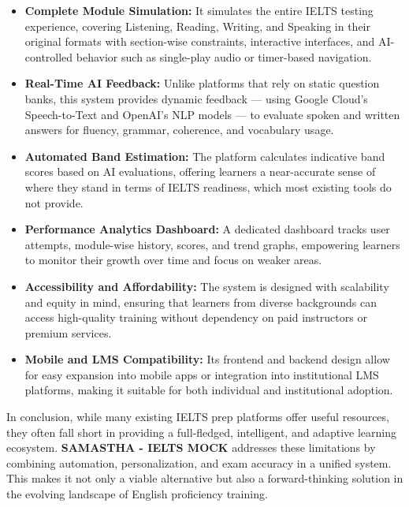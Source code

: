 \documentclass[a4paper,12pt]{article}
\begin{document}
\vspace{0.3cm}
\begin{itemize}
    \item \textbf{Complete Module Simulation:} It simulates the entire IELTS testing experience, covering Listening, Reading, Writing, and Speaking in their original formats with section-wise constraints, interactive interfaces, and AI-controlled behavior such as single-play audio or timer-based navigation.
    
    \item \textbf{Real-Time AI Feedback:} Unlike platforms that rely on static question banks, this system provides dynamic feedback — using Google Cloud’s Speech-to-Text and OpenAI’s NLP models — to evaluate spoken and written answers for fluency, grammar, coherence, and vocabulary usage.
    
    \item \textbf{Automated Band Estimation:} The platform calculates indicative band scores based on AI evaluations, offering learners a near-accurate sense of where they stand in terms of IELTS readiness, which most existing tools do not provide.
    
    \item \textbf{Performance Analytics Dashboard:} A dedicated dashboard tracks user attempts, module-wise history, scores, and trend graphs, empowering learners to monitor their growth over time and focus on weaker areas.
    
    \item \textbf{Accessibility and Affordability:} The system is designed with scalability and equity in mind, ensuring that learners from diverse backgrounds can access high-quality training without dependency on paid instructors or premium services.
    
    \item \textbf{Mobile and LMS Compatibility:} Its frontend and backend design allow for easy expansion into mobile apps or integration into institutional LMS platforms, making it suitable for both individual and institutional adoption.
\end{itemize}

\vspace{0.3cm}

In conclusion, while many existing IELTS prep platforms offer useful resources, they often fall short in providing a full-fledged, intelligent, and adaptive learning ecosystem. \textbf{SAMASTHA - IELTS MOCK} addresses these limitations by combining automation, personalization, and exam accuracy in a unified system. This makes it not only a viable alternative but also a forward-thinking solution in the evolving landscape of English proficiency training.
\end{document}
